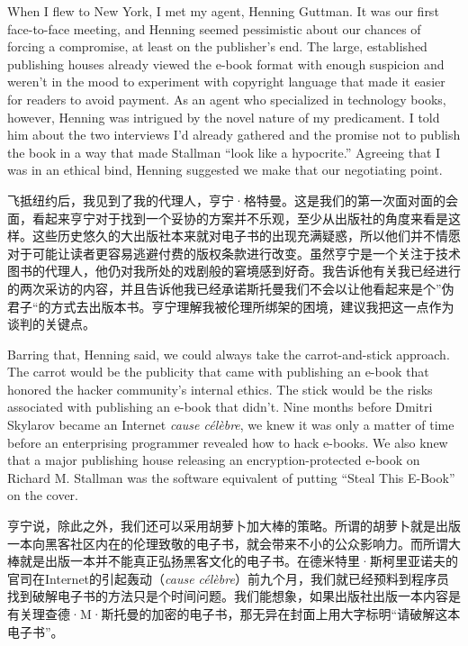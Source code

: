 \ifdefined\eng
When I flew to New York, I met my agent, Henning Guttman. It was our first face-to-face meeting, and Henning seemed pessimistic about our chances of forcing a compromise, at least on the publisher's end. The large, established publishing houses already viewed the e-book format with enough suspicion and weren't in the mood to experiment with copyright language that made it easier for readers to avoid payment. As an agent who specialized in technology books, however, Henning was intrigued by the novel nature of my predicament. I told him about the two interviews I'd already gathered and the promise not to publish the book in a way that made Stallman ``look like a hypocrite.'' Agreeing that I was in an ethical bind, Henning suggested we make that our negotiating point.
\fi

\ifdefined\chs
飞抵纽约后，我见到了我的代理人，亨宁·格特曼。这是我们的第一次面对面的会面，看起来亨宁对于找到一个妥协的方案并不乐观，至少从出版社的角度来看是这样。这些历史悠久的大出版社本来就对电子书的出现充满疑惑，所以他们并不情愿对于可能让读者更容易逃避付费的版权条款进行改变。虽然亨宁是一个关注于技术图书的代理人，他仍对我所处的戏剧般的窘境感到好奇。我告诉他有关我已经进行的两次采访的内容，并且告诉他我已经承诺斯托曼我们不会以让他看起来是个”伪君子“的方式去出版本书。亨宁理解我被伦理所绑架的困境，建议我把这一点作为谈判的关键点。
\fi

\ifdefined\eng
Barring that, Henning said, we could always take the carrot-and-stick approach. The carrot would be the publicity that came with publishing an e-book that honored the hacker community's internal ethics. The stick would be the risks associated with publishing an e-book that didn't. Nine months before Dmitri Skylarov became an Internet \textit{cause célèbre}, we knew it was only a matter of time before an enterprising programmer revealed how to hack e-books. We also knew that a major publishing house releasing an encryption-protected e-book on Richard M. Stallman was the software equivalent of putting ``Steal This E-Book'' on the cover.
\fi

\ifdefined\chs
亨宁说，除此之外，我们还可以采用胡萝卜加大棒的策略。所谓的胡萝卜就是出版一本向黑客社区内在的伦理致敬的电子书，就会带来不小的公众影响力。而所谓大棒就是出版一本并不能真正弘扬黑客文化的电子书。在德米特里·斯柯里亚诺夫的官司在Internet的引起轰动（\textit{cause célèbre}）前九个月，我们就已经预料到程序员找到破解电子书的方法只是个时间问题。我们能想象，如果出版社出版一本内容是有关理查德·M·斯托曼的加密的电子书，那无异在封面上用大字标明“请破解这本电子书”。
\fi

